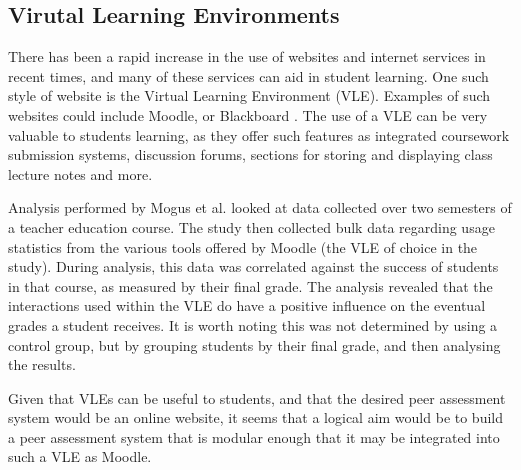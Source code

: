 \documentclass[a4paper,11pt]{report}
\begin{document}
\subsection{Virutal Learning Environments}
There has been a rapid increase in the use of websites and internet services in recent times, and many of these services can aid in student learning. One such style of website is the Virtual Learning Environment (VLE). Examples of such websites could include Moodle, \cite{moodle_about_2016} or Blackboard \cite{blackboard_blackboard_2016}. The use of a VLE can be very valuable to students learning, as they offer such features as integrated coursework submission systems, discussion forums, sections for storing and displaying class lecture notes and more.\par
Analysis performed by Mogus et al. \cite{mogus_impact_2012} looked at data collected over two semesters of a teacher education course. The study then collected bulk data regarding usage statistics from the various tools offered by Moodle (the VLE of choice in the study). During analysis, this data was correlated against the success of students in that course, as measured by their final grade. The analysis 
revealed that the interactions used within the VLE do have a positive influence on the eventual grades a student receives. It is worth noting this was not determined by using a control group, but by grouping students by their final grade, and then analysing the results.\par
Given that VLEs can be useful to students, and that the desired peer assessment system would be an online website, it seems that a logical aim would be to build a peer assessment system that is modular enough that it may be integrated into such a VLE as Moodle.\par
\end{document}
